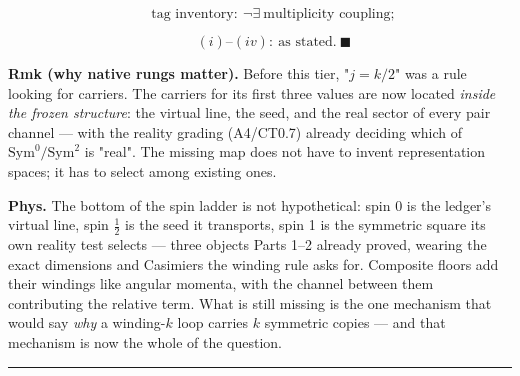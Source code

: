 \begin{theorem}
\[
\qquad \text{tag inventory}:\ \neg\exists\ \text{multiplicity coupling};
\]

\[
\qquad (i)\text{--}(iv):\ \text{as stated}.\ \blacksquare
\]

\textbf{Rmk (why native rungs matter).} Before this tier, "$j=k/2$" was a rule looking for carriers. The carriers for its first three values are now located \textit{inside the frozen structure}: the virtual line, the seed, and the real sector of every pair channel — with the reality grading (A4/CT0.7) already deciding which of $\mathrm{Sym}^0/\mathrm{Sym}^2$ is "real". The missing map does not have to invent representation spaces; it has to select among existing ones.

\textbf{Phys.} The bottom of the spin ladder is not hypothetical: spin 0 is the ledger's virtual line, spin $\tfrac12$ is the seed it transports, spin 1 is the symmetric square its own reality test selects — three objects Parts 1–2 already proved, wearing the exact dimensions and Casimiers the winding rule asks for. Composite floors add their windings like angular momenta, with the channel between them contributing the relative term. What is still missing is the one mechanism that would say \textit{why} a winding-$k$ loop carries $k$ symmetric copies — and that mechanism is now the whole of the question.

\vspace{2pt}\noindent\rule{\textwidth}{0.4pt}\vspace{2pt}

\end{theorem}


